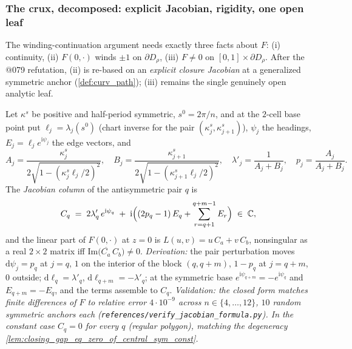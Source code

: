 \subsubsection*{The crux, decomposed: explicit Jacobian, rigidity, one open leaf}

The winding-continuation argument needs exactly three facts about $F$:
(i) continuity, (ii) $F(0,\cdot)$ winds $\pm1$ on $\partial D_\rho$, (iii) $F \ne 0$
on $[0,1]\times\partial D_\rho$. After the @079 refutation, (ii) is re-based on an
\emph{explicit closure Jacobian} at a generalized symmetric anchor
(\cref{def:curv_path}); (iii) remains the single genuinely open analytic leaf.

\begin{definition}

  \label{def:closing_jacobian_col}
  Let $\kappa^s$ be positive and half-period symmetric, $s^0 = 2\pi/n$, and at
  the $2$-cell base point put $\ell_j = \lambda_j(s^0)$ (chart inverse for the
  pair $(\kappa^s_j, \kappa^s_{j+1})$), $\psi_j$ the headings, $E_j = \ell_j
  e^{\mathrm{i}\psi_j}$ the edge vectors, and
  \[
    A_j = \frac{\kappa^s_j}{2\sqrt{1 - (\kappa^s_j \ell_j/2)^2}}, \quad
    B_j = \frac{\kappa^s_{j+1}}{2\sqrt{1 - (\kappa^s_{j+1} \ell_j/2)^2}}, \quad
    \lambda'_j = \frac{1}{A_j + B_j}, \quad p_j = \frac{A_j}{A_j + B_j}.
  \]
  The \emph{Jacobian column} of the antisymmetric pair $q$ is
  \[
    C_q \;=\; 2\lambda'_q\, e^{\mathrm{i}\psi_q}
      \;+\; \mathrm{i}\Bigl((2p_q - 1)\,E_q + \sum_{r=q+1}^{q+m-1} E_r\Bigr)
      \;\in\; \mathbb{C},
  \]
  and the linear part of $F(0,\cdot)$ at $z = 0$ is $L(u,v) = u\,C_a + v\,C_b$,
  nonsingular as a real $2\times2$ matrix iff
  $\mathrm{Im}\bigl(\overline{C_a}\,C_b\bigr) \ne 0$.
  \emph{Derivation:} the pair perturbation moves $\mathrm{d}\psi_j = p_q$ at
  $j = q$, $1$ on the interior of the block $(q, q+m)$, $1 - p_q$ at $j = q+m$,
  $0$ outside; $\mathrm{d}\ell_q = \lambda'_q$, $\mathrm{d}\ell_{q+m} =
  -\lambda'_q$; at the symmetric base $e^{\mathrm{i}\psi_{q+m}} =
  -e^{\mathrm{i}\psi_q}$ and $E_{q+m} = -E_q$, and the terms assemble to $C_q$.
  \emph{Validation: the closed form matches finite differences of $F$ to
  relative error $4\cdot10^{-9}$ across $n \in \{4,\dots,12\}$, $10$ random
  symmetric anchors each (\texttt{references/verify\_jacobian\_formula.py}).
  In the constant case $C_q = 0$ for every $q$ (regular polygon), matching the
  degeneracy \cref{lem:closing_gap_eq_zero_of_central_sym_const}.}
\end{definition}

